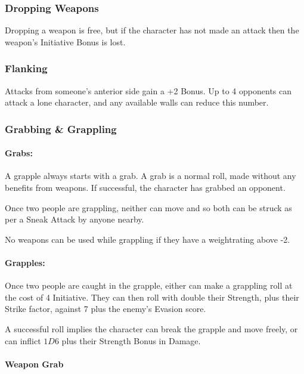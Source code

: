 \begin{multicols}{2}
\subsubsection{Dropping Weapons}

Dropping a weapon is free, but if the character has not made an attack then the weapon's Initiative Bonus is lost.

\subsubsection{Flanking}\label{flank}

Attacks from someone's anterior side gain a +2 Bonus.
Up to 4 opponents can attack a lone character, and any available walls can reduce this number.

\subsubsection{Grabbing \& Grappling}

\paragraph{Grabs:}

A grapple always starts with a grab.  A grab is a normal roll, made without any benefits from weapons.  If successful, the character has grabbed an opponent.

Once two people are grappling, neither can move and so both can be struck as per a Sneak Attack by anyone nearby.

No weapons can be used while grappling if they have a \gls{weightrating} above -2.

\paragraph{Grapples:}

Once two people are caught in the grapple, either can make a grappling roll at the cost of 4 Initiative.  They can then roll with double their Strength, plus their Strike factor, against 7 plus the enemy's Evasion score.

A successful roll implies the character can break the grapple and move freely, or can inflict $1D6$ plus their Strength Bonus in Damage.

\paragraph{Weapon Grab}


\end{multicols}
